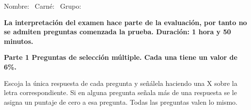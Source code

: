 \documentclass[11pt]{article}
\begin{document}
\examheader

\vspace{4pt}
\noindent Nombre: \dotfill\ Carné: \dotfill\ Grupo: \dotfill

\vspace{8pt}
\noindent\textbf{La interpretación del examen hace parte de la evaluación, por tanto no se admiten preguntas comenzada la prueba. Duración: 1 hora y 50 minutos.}

\vspace{10pt}
\noindent\textbf{Parte 1 Preguntas de selección múltiple. Cada una tiene un valor de 6\%.}

\noindent Escoja la única respuesta de cada pregunta y señálela haciendo una X sobre la letra correspondiente. Si en alguna pregunta señala más de una respuesta se le asigna un puntaje de cero a esa pregunta. Todas las preguntas valen lo mismo.
\end{document}
